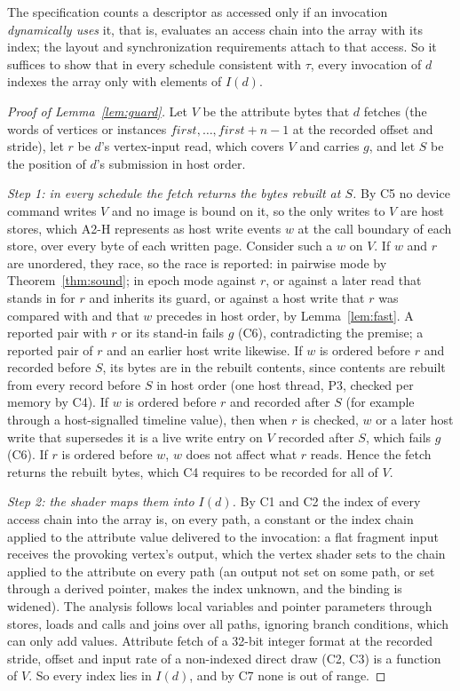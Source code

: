 The specification counts a descriptor as accessed only if an invocation \emph{dynamically uses} it, that is, evaluates
an access chain into the array with its index; the layout and synchronization requirements attach to that access. So
it suffices to show that in every schedule consistent with $\tau$, every invocation of $d$ indexes the array only with
elements of $I(d)$.

\begin{proof}[Proof of Lemma~\ref{lem:guard}]
Let $V$ be the attribute bytes that $d$ fetches (the words of vertices or instances $\mathit{first}, \dots,
\mathit{first}+n-1$ at the recorded offset and stride), let $r$ be $d$'s vertex-input read, which covers $V$ and
carries $g$, and let $S$ be the position of $d$'s submission in host order.

\emph{Step 1: in every schedule the fetch returns the bytes rebuilt at $S$.} By C5 no device command writes $V$ and no
image is bound on it, so the only writes to $V$ are host stores, which A2-H represents as host write events $w$ at the
call boundary of each store, over every byte of each written page. Consider such a $w$ on $V$. If $w$ and $r$ are
unordered, they race, so the race is reported: in pairwise mode by Theorem~\ref{thm:sound}; in epoch mode against $r$,
or against a later read that stands in for $r$ and inherits its guard, or against a host write that $r$ was compared
with and that $w$ precedes in host order, by Lemma~\ref{lem:fast}. A reported pair with $r$ or its stand-in fails $g$
(C6), contradicting the premise; a reported pair of $r$ and an earlier host write likewise. If $w$ is ordered before
$r$ and recorded before $S$, its bytes are in the rebuilt contents, since contents are rebuilt from every record before
$S$ in host order (one host thread, P3, checked per memory by C4). If $w$ is ordered before $r$ and recorded after
$S$ (for example through a host-signalled timeline value), then when $r$ is checked, $w$ or a later host write that
supersedes it is a live write entry on $V$ recorded after $S$, which fails $g$ (C6). If $r$ is ordered before $w$, $w$
does not affect what $r$ reads. Hence the fetch returns the rebuilt bytes, which C4 requires to be recorded for all of
$V$.

\emph{Step 2: the shader maps them into $I(d)$.} By C1 and C2 the index of every access chain into the array is, on
every path, a constant or the index chain applied to the attribute value delivered to the invocation: a flat fragment
input receives the provoking vertex's output, which the vertex shader sets to the chain applied to the attribute on
every path (an output not set on some path, or set through a derived pointer, makes the index unknown, and the binding
is widened). The analysis follows local variables and pointer parameters through stores, loads and calls and joins
over all paths, ignoring branch conditions, which can only add values. Attribute fetch of a 32-bit integer format at
the recorded stride, offset and input rate of a non-indexed direct draw (C2, C3) is a function of $V$. So every index
lies in $I(d)$, and by C7 none is out of range.


\end{proof}
